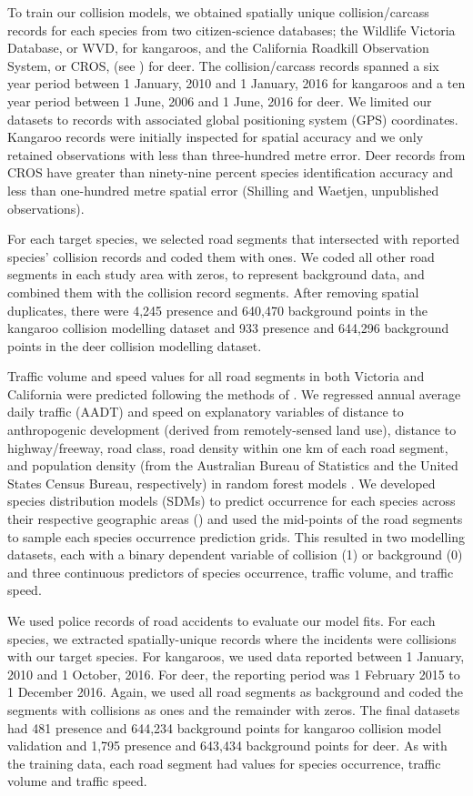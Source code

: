To train our collision models, we obtained spatially unique collision/carcass records for each species from two citizen-science databases; the Wildlife Victoria Database, or WVD, \citep{wv16} for kangaroos, and the California Roadkill Observation System, or CROS, (see \cite{shil15a}) for deer.  The collision/carcass records spanned a six year period between 1 January, 2010 and 1 January, 2016 for kangaroos and a ten year period between 1 June, 2006 and 1 June, 2016 for deer. We limited our datasets to records with associated global positioning system (GPS) coordinates. Kangaroo records were initially inspected for spatial accuracy and we only retained observations with less than three-hundred metre error. Deer records from CROS have greater than ninety-nine percent species identification accuracy and less than one-hundred metre spatial error (Shilling and Waetjen, unpublished observations).

For each target species, we selected road segments that intersected with reported species’ collision records and coded them with ones. We coded all other road segments in each study area with zeros, to represent background data, and combined them with the collision record segments.  After removing spatial duplicates, there were 4,245 presence and 640,470 background points in the kangaroo collision modelling dataset and 933 presence and 644,296 background points in the deer collision modelling dataset.

Traffic volume and speed values for all road segments in both Victoria and California were predicted following the methods of .  We regressed annual average daily traffic (AADT) and speed on explanatory variables of distance to anthropogenic development (derived from remotely-sensed land use), distance to highway/freeway, road class, road density within one km of each road segment, and population density (from the Australian Bureau of Statistics and the United States Census Bureau, respectively) in random forest models \citep{brei01}. We developed species distribution models (SDMs) to predict occurrence for each species across their respective geographic areas () and used the mid-points of the road segments to sample each species occurrence prediction grids. This resulted in two modelling datasets, each with a binary dependent variable of collision (1) or background (0) and three continuous predictors of species occurrence, traffic volume, and traffic speed.  

We used police records of road accidents to evaluate our model fits.  For each species, we extracted spatially-unique records where the incidents were collisions with our target species.  For kangaroos, we used data reported between 1 January, 2010 and 1 October, 2016. For deer, the reporting period was 1 February 2015 to 1 December 2016.  Again, we used all road segments as background and coded the segments with collisions as ones and the remainder with zeros. The final datasets had 481 presence and 644,234 background points for kangaroo collision model validation and 1,795 presence and 643,434 background points for deer. As with the training data, each road segment had values for species occurrence, traffic volume and traffic speed.

